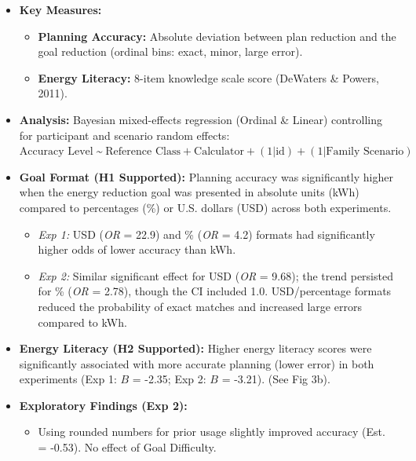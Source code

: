 \documentclass[
  12pt,
]{article}
\providecommand{\tightlist}{%
  \setlength{\itemsep}{0pt}\setlength{\parskip}{0pt}}
\begin{document}
\begin{multicols}{3}
\begin{itemize}
\tightlist
\item
  \textbf{Key Measures:}

  \begin{itemize}
  \tightlist
  \item
    \textbf{Planning Accuracy:} Absolute deviation between plan
    reduction and the goal reduction (ordinal bins: exact, minor, large
    error).
  \item
    \textbf{Energy Literacy:} 8-item knowledge scale score (DeWaters \&
    Powers, 2011).
  \end{itemize}
\item
  \textbf{Analysis:} Bayesian mixed-effects regression (Ordinal \&
  Linear) controlling for participant and scenario random effects:
  \(\text{Accuracy Level} \; \text{\textasciitilde} \; \text{Reference Class} + \text{Calculator} + (1|\text{id}) + (1|\text{Family Scenario})\)
\item
  \textbf{Goal Format (H1 Supported):} Planning accuracy was
  significantly higher when the energy reduction goal was presented in
  absolute units (kWh) compared to percentages (\%) or U.S. dollars
  (USD) across both experiments.

  \begin{itemize}
  \tightlist
  \item
    \emph{Exp 1:} USD (\emph{OR} = 22.9) and \% (\emph{OR} = 4.2)
    formats had significantly higher odds of lower accuracy than kWh.
  \item
    \emph{Exp 2:} Similar significant effect for USD (\emph{OR} = 9.68);
    the trend persisted for \% (\emph{OR} = 2.78), though the CI
    included 1.0. USD/percentage formats reduced the probability of
    exact matches and increased large errors compared to kWh.
  \end{itemize}
\item
  \textbf{Energy Literacy (H2 Supported):} Higher energy literacy scores
  were significantly associated with more accurate planning (lower
  error) in both experiments (Exp 1: \(B\) = -2.35; Exp 2: \(B\) =
  -3.21). (See Fig 3b).
\item
  \textbf{Exploratory Findings (Exp 2):}

  \begin{itemize}
  \tightlist
  \item
    Using rounded numbers for prior usage slightly improved accuracy
    (Est. = -0.53). No effect of Goal Difficulty.
  \end{itemize}
\end{itemize}


\end{multicols}
\end{document}
